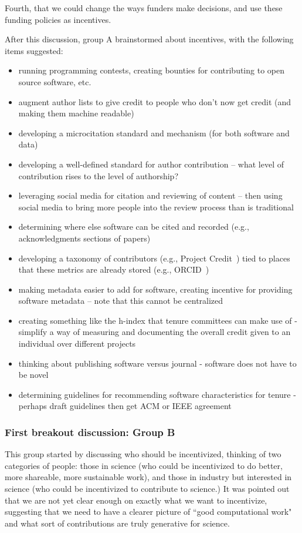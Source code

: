 \documentclass[11pt, oneside]{amsart}
\begin{document}
Fourth, that we could change the ways funders make decisions, and use these
funding policies as incentives.

After this discussion, group A brainstormed about incentives,
with the following items suggested:
\begin{itemize}
\item running programming contests, creating bounties for contributing to open
source software, etc.
\item augment author lists to give credit to people who don't now get credit
(and making them machine readable)
\item developing a microcitation standard and mechanism (for both software and
data)
\item developing a well-defined standard for author contribution -- what level
of contribution rises to the level of authorship?
\item leveraging social media for citation and reviewing of content -- then
using social media to bring more people into the review process than is
traditional
\item determining where else software can be cited and recorded (e.g.,
acknowledgments sections of papers)
\item developing a taxonomy of contributors (e.g., Project
Credit~\cite{projectcredit}) tied to places that these metrics are already
stored (e.g., ORCID~\cite{orcid})
\item making metadata easier to add for software, creating incentive for
providing software metadata -- note that this cannot be centralized
\item creating something like the h-index that tenure committees can make use of
- simplify a way of measuring and documenting the overall credit given to an
individual over different projects
\item thinking about publishing software versus journal - software does not have to
be novel
\item determining guidelines for recommending software characteristics for
tenure - perhaps draft guidelines then get ACM or IEEE agreement
\end{itemize}


\subsubsection{First breakout discussion: Group B}

This group started by discussing who should be incentivized, thinking of two
categories of people: those in science (who could be incentivized to do better,
more shareable, more sustainable work), and those in industry but interested in
science (who could be incentivized to contribute to science.) It was pointed out
that we are not yet clear enough on exactly what we want to incentivize,
suggesting that we need to have a clearer picture of ``good computational work"
and what sort of contributions are truly generative for science.
\end{document}
